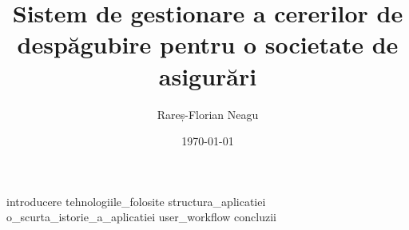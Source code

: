\documentclass[a4paper,12pt]{report}
\title{Sistem de gestionare a cererilor de despăgubire pentru o societate de asigurări}
\author{Rareș-Florian Neagu}
\date{\today}
\begin{document}
\maketitle
\tableofcontents
\newpage
{introducere}
\newpage
{tehnologiile_folosite}
\newpage
{structura_aplicatiei}
\newpage
{o_scurta_istorie_a_aplicatiei}
\newpage
{user_workflow}
\newpage
{concluzii}
\newpage
{}
\printbibliography[title={Bibliografie}]
\end{document}

